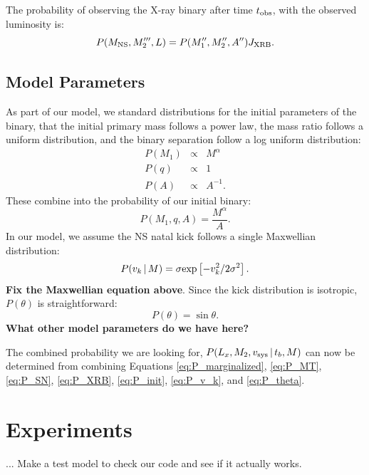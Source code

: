 \documentclass[12pt, preprint]{aastex}
\newcommand{\given}{\,|\,}
\begin{document}
The probability of observing the X-ray binary after time $t_{\rm obs}$, with the observed luminosity is:
\begin{equation}
P(M_{\rm NS}, M'''_2, L) = P(M''_1, M''_2, A'') J_{\rm XRB}. \label{eq:P_XRB}
\end{equation}



\subsection{Model Parameters}

As part of our model, we standard distributions for the initial parameters of the binary, that the initial primary mass follows a power law, the mass ratio follows a uniform distribution, and the binary separation follow a log uniform distribution:
\begin{eqnarray}
P(M_1) &\propto& M^{\alpha} \\
P(q) &\propto& 1 \\
P(A) &\propto& A^{-1}.
\end{eqnarray}
These combine into the probability of our initial binary:
\begin{equation}
P(M_1, q, A) = \frac{M^{\alpha}}{A}. \label{eq:P_init}
\end{equation}
In our model, we assume the NS natal kick follows a single Maxwellian distribution:
\begin{equation}
P(v_k \given M) = \sigma {\rm exp} \left[ -v_k^2 / 2 \sigma^2 \right]. \label{eq:P_v_k}
\end{equation}
{\bf Fix the Maxwellian equation above}. Since the kick distribution is isotropic, $P(\theta)$ is straightforward:
\begin{equation}
P(\theta) = \sin \theta. \label{eq:P_theta}
\end{equation}
{\bf What other model parameters do we have here?}

The combined probability we are looking for, $P(L_x, M_2, v_{\rm sys} \given t_b, M)$ can now be determined from combining Equations \ref{eq:P_marginalized}, \ref{eq:P_MT}, \ref{eq:P_SN}, \ref{eq:P_XRB}, \ref{eq:P_init}, \ref{eq:P_v_k}, and \ref{eq:P_theta}.



\section{Experiments}

... Make a test model to check our code and see if it actually works.
\end{document}
